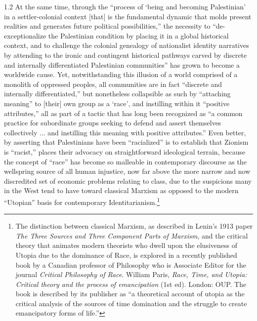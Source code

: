 \documentclass[../unravbook.tex]{subfiles}
\begin{document}
\begin{spacing}{1.2}
At the same time, through the ``process of `being and becoming Palestinian' in a settler-colonial context [that] is the fundamental dynamic that molds present realities and generates future political possibilities,'' the necessity to ``de-exceptionalize the Palestinian condition by placing it in a global historical context, and to challenge the colonial genealogy of nationalist identity narratives by attending to the ironic and contingent historical pathways carved by discrete and internally differentiated Palestinian communities'' has grown to become a worldwide cause. Yet, notwithstanding this illusion of a world comprised of a monolith of oppressed peoples, all communities are in fact ``discrete and internally differentiated,'' but nonetheless collapsible as such by ``attaching meaning'' to [their] own group as a `race', and instilling within it  ``positive attributes,'' all as part of a tactic that has long been recognized as ``a common practice for subordinate groups seeking to defend and assert themselves collectively ... and instilling this meaning with positive attributes.'' Even better, by asserting that Palestinians have been ``racialized'' is to establish that Zionism is ``racist,'' places their advocacy on straightforward ideological terrain, because the concept of ``race'' has become so malleable in contemporary discourse as the wellspring source of all human injustice, now far above the more narrow and now discredited set of economic problems relating to class, due to the suspicions many in the West tend to have toward classical Marxism as opposed to the modern ``Utopian'' basis for contemporary Identitarianism.\footnote{The distinction between classical Marxism, as described in Lenin's 1913 paper \textit{The Three Sources and Three Component Parts of Marxism}, and the critical theory that animates modern theorists who dwell upon the elusiveness of Utopia due to the dominance of Race, is explored in a recently published book by a Canadian professor of Philosophy who is Associate Editor for the journal \textit{Critical Philosophy of Race}. William Paris, \textit{Race, Time, and Utopia: Critical theory and the process of emancipation}  (1st ed). London: OUP. The book is described by its publisher as ``a theoretical account of utopia as the critical analysis of the sources of time domination and the struggle to create emancipatory forms of life.''}


\end{spacing}
\end{document}
